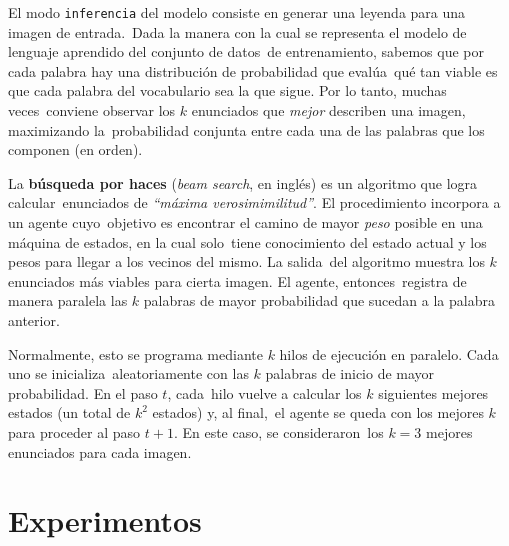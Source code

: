 \noindent
El modo \verb+inferencia+ del modelo consiste en generar una leyenda para una imagen de entrada.\
Dada la manera con la cual se representa el modelo de lenguaje aprendido del conjunto de datos\
de entrenamiento, sabemos que por cada palabra hay una distribución de probabilidad que evalúa\
qué tan viable es que cada palabra del vocabulario sea la que sigue. Por lo tanto, muchas veces\
conviene observar los $k$ enunciados que \emph{mejor} describen una imagen, maximizando la\
probabilidad conjunta entre cada una de las palabras que los componen (en orden).\par
La \textbf{búsqueda por haces} (\emph{beam search}, en inglés) es un algoritmo que logra calcular\
enunciados de \emph{``máxima verosimimilitud''}. El procedimiento incorpora a un agente cuyo\
objetivo es encontrar el camino de mayor \emph{peso} posible en una máquina de estados, en la cual solo\
tiene conocimiento del estado actual y los pesos para llegar a los vecinos del mismo. La salida\
del algoritmo muestra los $k$ enunciados más viables para cierta imagen. El agente, entonces\
registra de manera paralela las $k$ palabras de mayor probabilidad que sucedan a la palabra anterior.\par
Normalmente, esto se programa mediante $k$ hilos de ejecución en paralelo. Cada uno se inicializa\
aleatoriamente con las $k$ palabras de inicio de mayor probabilidad. En el paso $t$, cada\
hilo vuelve a calcular los $k$ siguientes mejores estados (un total de $k^2$ estados) y, al final,\
el agente se queda con los mejores $k$ para proceder al paso $t+1$. En este caso, se consideraron\
los $k=3$ mejores enunciados para cada imagen.

\section{Experimentos}

